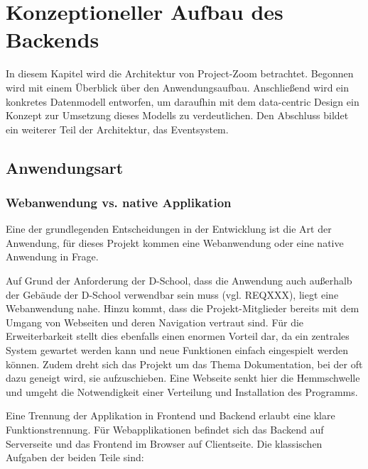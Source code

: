 \chapter{Konzeptioneller Aufbau des Backends}

In diesem Kapitel wird die Architektur von Project-Zoom betrachtet. Begonnen wird mit einem Überblick über den Anwendungsaufbau. Anschließend wird ein konkretes Datenmodell entworfen, um daraufhin mit dem data-centric Design ein Konzept zur Umsetzung dieses Modells zu verdeutlichen.  Den Abschluss bildet ein weiterer Teil der Architektur, das Eventsystem.

\section{Anwendungsart}
\subsection{Webanwendung vs. native Applikation}
Eine der grundlegenden Entscheidungen in der Entwicklung ist die Art der Anwendung, für dieses Projekt kommen eine Webanwendung oder eine native Anwendung in Frage. 

Auf Grund der Anforderung der D-School, dass die Anwendung auch außerhalb der Gebäude der D-School verwendbar sein muss (vgl. REQXXX), liegt eine Webanwendung nahe. Hinzu kommt, dass die Projekt-Mitglieder bereits mit dem Umgang von Webseiten und deren Navigation vertraut sind. Für die Erweiterbarkeit stellt dies ebenfalls einen enormen Vorteil dar, da ein zentrales System gewartet werden kann und neue Funktionen einfach eingespielt werden können. Zudem dreht sich das Projekt um das Thema Dokumentation, bei der oft dazu geneigt wird, sie aufzuschieben. Eine Webseite senkt hier die Hemmschwelle und umgeht die Notwendigkeit einer Verteilung und Installation des Programms.

Eine Trennung der Applikation in Frontend und Backend erlaubt eine klare Funktionstrennung. Für Webapplikationen befindet sich das Backend auf Serverseite und das Frontend im Browser auf Clientseite. Die klassischen Aufgaben der beiden Teile sind:

